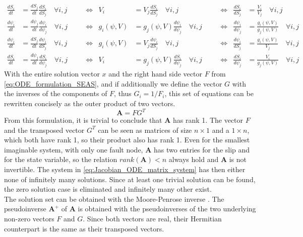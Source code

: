 \documentclass{report}
\begin{document}
\begin{align}
\frac{dS_i}{dt} &= \frac{dS_j}{dt}\frac{dS_i}{dS_j} \quad\forall i,j \quad&&\Leftrightarrow& V_i &= V_j \frac{dS_i}{dS_j} \quad\forall i,j \quad&&\Leftrightarrow& \frac{dS_i}{dS_j} &= \frac{V_i}{V_j} \quad\forall i,j \\
\frac{d\psi_i}{dt} &= \frac{d\psi_j}{dt}\frac{d\psi_i}{d\psi_j} \quad\forall i,j \quad&&\Leftrightarrow& g_i(\psi, V) &= g_j(\psi, V) \frac{d\psi_i}{d\psi_j} \quad\forall i,j \quad&&\Leftrightarrow& \frac{d\psi_i}{d\psi_j} &= \frac{g_i(\psi, V)}{g_j(\psi, V)} \quad\forall i,j \\
\frac{d\psi_i}{dt} &= \frac{dS_j}{dt}\frac{d\psi_i}{dS_j} \quad\forall i,j \quad&&\Leftrightarrow& g_i(\psi, V) &= V_j \frac{d\psi_i}{dS_j} \quad\forall i,j \quad&&\Leftrightarrow& \frac{d\psi_i}{dS_j} &= \frac{g_i(\psi, V)}{V_j} \quad\forall i,j \\
\frac{dS_i}{dt} &= \frac{d\psi_j}{dt}\frac{dS_i}{d\psi_j} \quad\forall i,j\quad&&\Leftrightarrow& V_i &= g_j(\psi, V) \frac{dS_i}{d\psi_j} \quad\forall i,j\quad&&\Leftrightarrow& \frac{dS_i}{d\psi_j} &= \frac{V_i}{g_j(\psi, V)}\quad\forall i,j
\end{align}
With the entire solution vector $x$ and the right hand side vector $F$ from \autoref{eq:ODE_formulation_SEAS}, and if additionally we define the vector $G$ with the inverses of the components of $F$, thus $G_i = 1 / F_i$, this set of equations can be rewritten concisely as the outer product of two vectors.
\begin{equation}
	\mathbf{A} = FG^T
\end{equation}
From this formulation, it is trivial to conclude that $\mathbf{A}$ has rank 1. The vector $F$ and the transposed vector $G^T$ can be seen as matrices of size $n \times 1$ and a $1 \times n$, which both have rank 1, so their product also has rank 1. Even for the smallest imaginable system, with only one fault node, $\mathbf{A}$ has two entries for the slip and for the state variable, so the relation $rank(\mathbf{A})<n$ always hold and $\mathbf{A}$ is not invertible. The system in \autoref{eq:Jacobian_ODE_matrix_system} has then either none of infinitely many solutions. Since at least one trivial solution can be found, the zero solution case is eliminated and infinitely many other exist. \\
The solution set can be obtained with the Moore-Penrose inverse \cite{MoorePenroseInverse}. The pseudoinverse $\mathbf{A}^+$ of $\mathbf{A}$ is obtained with the pseudoinverses of the two underlying non-zero vectors $F$ and $G$. Since both vectors are real, their Hermitian counterpart is the same as their transposed vectors.
\end{document}
